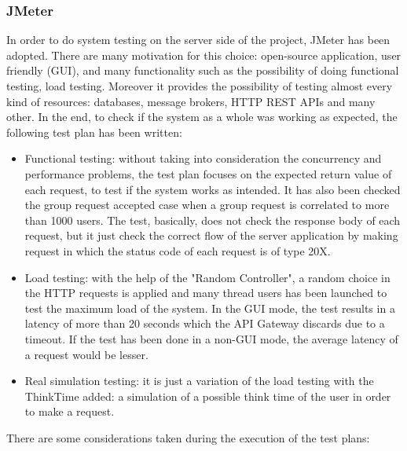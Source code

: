 \subsubsection{JMeter} 
In order to do system testing on the server side of the project, JMeter has been adopted. There are many motivation for this choice: 
open-source application, user friendly (GUI), and many functionality such as the possibility of doing functional testing, load testing. Moreover it provides the possibility of testing almost every kind of resources: databases, message brokers, HTTP REST APIs and 
many other. In the end, to check if the system as a whole was working as expected, the following test plan has been written:
\begin{itemize}
\item Functional testing: without taking into consideration the concurrency and performance problems, the test plan focuses on 
the expected return value of each request, to test if the system works as intended. It has also been checked the group 
request accepted case when a group request is correlated to more than 1000 users. The test, basically, does not check the response body of each request, but it just check the correct flow of the server application by making request in which the status code of each request is of type 20X.
\item Load testing: with the help of the "Random Controller", a random choice in the HTTP requests is applied and many thread 
users has been launched to test the maximum load of the system. In the GUI mode, the test results in a latency of more than 
20 seconds which the API Gateway discards due to a timeout. If the test has been done in a non-GUI mode, the average latency 
of a request would be lesser.
\item Real simulation testing: it is just a variation of the load testing with the ThinkTime added: a simulation of a possible think time 
of the user in order to make a request.
\end{itemize}
There are some considerations taken during the execution of the test plans:
